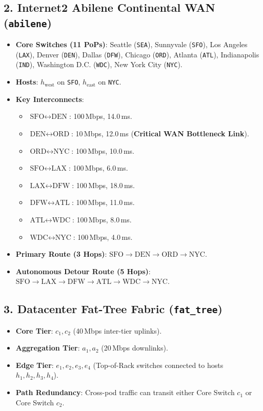 \subsection{2. Internet2 Abilene Continental WAN (\texttt{abilene})}
\begin{itemize}
  \item \textbf{Core Switches (11 PoPs)}: Seattle (\texttt{SEA}), Sunnyvale (\texttt{SFO}), Los Angeles (\texttt{LAX}), Denver (\texttt{DEN}), Dallas (\texttt{DFW}), Chicago (\texttt{ORD}), Atlanta (\texttt{ATL}), Indianapolis (\texttt{IND}), Washington D.C. (\texttt{WDC}), New York City (\texttt{NYC}).
  \item \textbf{Hosts}: $h_{\text{west}}$ on \texttt{SFO}, $h_{\text{east}}$ on \texttt{NYC}.
  \item \textbf{Key Interconnects}:
    \begin{itemize}
      \item $\text{SFO} \leftrightarrow \text{DEN}$: 100\,Mbps, 14.0\,ms.
      \item $\text{DEN} \leftrightarrow \text{ORD}$: 10\,Mbps, 12.0\,ms (\textbf{Critical WAN Bottleneck Link}).
      \item $\text{ORD} \leftrightarrow \text{NYC}$: 100\,Mbps, 10.0\,ms.
      \item $\text{SFO} \leftrightarrow \text{LAX}$: 100\,Mbps, 6.0\,ms.
      \item $\text{LAX} \leftrightarrow \text{DFW}$: 100\,Mbps, 18.0\,ms.
      \item $\text{DFW} \leftrightarrow \text{ATL}$: 100\,Mbps, 11.0\,ms.
      \item $\text{ATL} \leftrightarrow \text{WDC}$: 100\,Mbps, 8.0\,ms.
      \item $\text{WDC} \leftrightarrow \text{NYC}$: 100\,Mbps, 4.0\,ms.
    \end{itemize}
  \item \textbf{Primary Route (3 Hops)}: $\text{SFO} \to \text{DEN} \to \text{ORD} \to \text{NYC}$.
  \item \textbf{Autonomous Detour Route (5 Hops)}: $\text{SFO} \to \text{LAX} \to \text{DFW} \to \text{ATL} \to \text{WDC} \to \text{NYC}$.
\end{itemize}

\subsection{3. Datacenter Fat-Tree Fabric (\texttt{fat\_tree})}
\begin{itemize}
  \item \textbf{Core Tier}: $c_1, c_2$ (40\,Mbps inter-tier uplinks).
  \item \textbf{Aggregation Tier}: $a_1, a_2$ (20\,Mbps downlinks).
  \item \textbf{Edge Tier}: $e_1, e_2, e_3, e_4$ (Top-of-Rack switches connected to hosts $h_1, h_2, h_3, h_4$).
  \item \textbf{Path Redundancy}: Cross-pod traffic can transit either Core Switch $c_1$ or Core Switch $c_2$.
\end{itemize}
